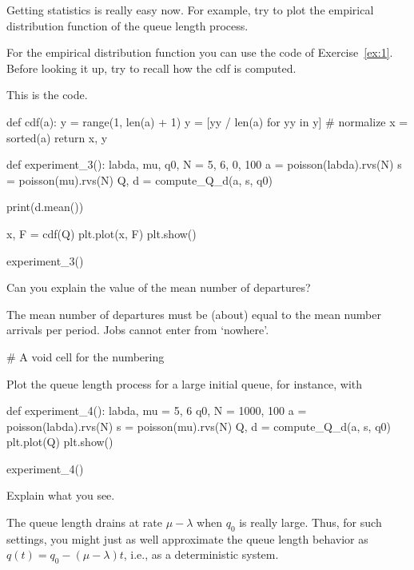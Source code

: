 \begin{exercise}
  Getting statistics is really easy now.
  For example, try to plot the empirical distribution function of the queue length process.
\begin{hint}
For  the empirical distribution function  you can use the code of Exercise~\ref{ex:1}. Before looking it up, try to recall how the cdf is computed.
\end{hint}


\begin{solution}
This is the code.
  \begin{pyverbatim}
def cdf(a):
    y = range(1, len(a) + 1)
    y = [yy / len(a) for yy in y]  # normalize
    x = sorted(a)
    return x, y

def experiment_3():
    labda, mu, q0, N = 5, 6, 0, 100
    a = poisson(labda).rvs(N)
    s = poisson(mu).rvs(N)
    Q, d = compute_Q_d(a, s, q0)

    print(d.mean())

    x, F = cdf(Q)
    plt.plot(x, F)
    plt.show()

experiment_3()
  \end{pyverbatim}
  \end{solution}
\end{exercise}

\begin{exercise}
  Can you explain the value of the mean number of departures?
\begin{solution}
  The mean number of departures must be (about) equal to the mean number arrivals per period.
  Jobs cannot enter from `nowhere'.

  \begin{pyverbatim}
# A void cell for the numbering    
  \end{pyverbatim}
  \end{solution}
\end{exercise}


\begin{exercise}
Plot the queue length process for a large initial queue, for instance, with

\begin{pyverbatim}
def experiment_4():
    labda, mu = 5, 6
    q0, N = 1000, 100
    a = poisson(labda).rvs(N)
    s = poisson(mu).rvs(N)
    Q, d = compute_Q_d(a, s, q0)
    plt.plot(Q)
    plt.show()


experiment_4()
\end{pyverbatim}
Explain what you see.
\begin{solution}
  The queue length drains at rate $\mu-\lambda$ when $q_0$ is really large.
  Thus, for such settings, you might just as well approximate the queue length behavior as $q(t) = q_0 - (\mu-\lambda)t$, i.e., as a deterministic system.

\end{solution}
\end{exercise}


